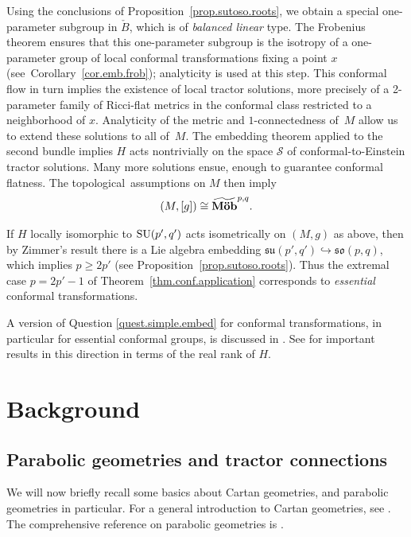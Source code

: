 \documentclass[10pt,a4paper]{amsart}
\numberwithin{equation}{section}
\theoremstyle{definition}
\newcommand{\so}{\mathfrak{so}}
\newcommand{\SU}{{\rm SU}}
\begin{document}
Using the conclusions of Proposition~\ref{prop.sutoso.roots}, we obtain a special one-parameter subgroup in $\check{B}$, which is of \emph{balanced linear} type.
The Frobenius theorem ensures that this one-parameter subgroup is the isotropy of a one-parameter group of local conformal transformations fixing a point $x$ (see~Corollary~\ref{cor.emb.frob}); analyticity is used at this step. This conformal flow in turn implies the existence of local tractor solutions, more precisely of a 2-parameter family of Ricci-flat metrics in the conformal class restricted to a neighborhood of $x$. Analyticity of the metric and $1$-connectedness of~$M$ allow us to extend these solutions to all of~$M$.
The embedding theorem applied to the second bundle implies $H$ acts nontrivially on the space $\mathcal{S}$ of conformal-to-Einstein tractor solutions. Many more solutions ensue, enough to guarantee conformal flatness. The topological~assumptions on $M$ then imply
\[
(M,[g]) \cong \widetilde{\mbox{{\bf M\"ob}}}^{p,q}.
\]

If $H$ locally isomorphic to $\SU(p',q')$ acts isometrically on $(M,g)$ as above, then by Zimmer's result there is a Lie algebra embedding $\mathfrak{su}(p',q') \hookrightarrow \so(p,q)$, which implies $p \geq 2p'$ (see Proposition~\ref{prop.sutoso.roots}). Thus the extremal case $p = 2p'-1$ of Theorem~\ref{thm.conf.application} corresponds to \emph{essential} conformal transformations.

A version of Question \ref{quest.simple.embed} for conformal transformations, in particular for essential conformal groups, is discussed in \cite{pecastaing.rank1}. See \cite{bn.simpleconf,fz.simpleconf} for important results in this direction in terms of the real rank of $H$.

\section{Background}

\subsection{Parabolic geometries and tractor connections}

\label{sec.parabolic.tractor}
We will now briefly recall some basics about Cartan geometries, and parabolic geometries in particular.
For a general introduction to Cartan geometries, see \cite{sharpe}.
The comprehensive reference on
parabolic geometries is \cite{cap.slovak.book.vol1}.
\end{document}
